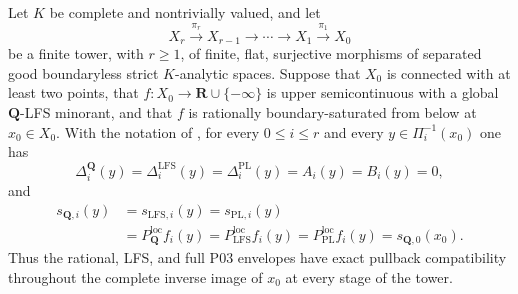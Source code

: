\begin{corollary}
\label{cor:p031-rational-boundary-saturation-tower-collapse}
Let $K$ be complete and nontrivially valued, and let
\[
 X_r\xrightarrow{\pi_r}X_{r-1}\longrightarrow\cdots
   \longrightarrow X_1\xrightarrow{\pi_1}X_0
\]
be a finite tower, with $r\geq1$, of finite, flat, surjective morphisms of
separated good boundaryless strict $K$-analytic spaces.  Suppose that $X_0$
is connected
with at least two points, that $f:X_0\to\mathbf R\cup\{-\infty\}$ is upper
semicontinuous with a global $\mathbf Q$-LFS minorant, and that $f$ is
rationally boundary-saturated from below at $x_0\in X_0$.  With the notation
of , for every
$0\leq i\leq r$ and every $y\in\Pi_i^{-1}(x_0)$ one has
\begin{equation}
\label{eq:p031-rational-boundary-saturation-tower-zero}
 \Delta_i^{\mathbf Q}(y)=\Delta_i^{\mathrm{LFS}}(y)
 =\Delta_i^{\mathrm{PL}}(y)=A_i(y)=B_i(y)=0,
\end{equation}
and
\begin{equation}
\label{eq:p031-rational-boundary-saturation-tower-collapse}
 \begin{split}
 s_{\mathbf Q,i}(y)&=s_{\mathrm{LFS},i}(y)=s_{\mathrm{PL},i}(y)\\
 &=P_{\mathbf Q}^{\mathrm{loc}}f_i(y)
   =P_{\mathrm{LFS}}^{\mathrm{loc}}f_i(y)
   =P_{\mathrm{PL}}^{\mathrm{loc}}f_i(y)
   =s_{\mathbf Q,0}(x_0).
 \end{split}
\end{equation}
Thus the rational, LFS, and full P03 envelopes have exact pullback
compatibility throughout the complete inverse image of $x_0$ at every
stage of the tower.
\end{corollary}
